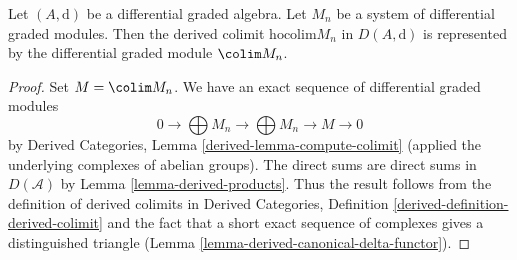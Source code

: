\begin{lemma}
\label{lemma-homotopy-colimit}
Let $(A, \text{d})$ be a differential graded algebra. Let
$M_n$ be a system of differential graded modules. Then the derived
colimit $\text{hocolim} M_n$ in $D(A, \text{d})$ is represented
by the differential graded module $\colim M_n$.
\end{lemma}

\begin{proof}
Set $M = \colim M_n$. We have an exact sequence of differential graded modules
$$
0 \to \bigoplus M_n \to \bigoplus M_n \to M \to 0
$$
by Derived Categories, Lemma \ref{derived-lemma-compute-colimit}
(applied the underlying complexes of abelian groups).
The direct sums are direct sums in $D(\mathcal{A})$ by
Lemma \ref{lemma-derived-products}.
Thus the result follows from the definition
of derived colimits in Derived Categories,
Definition \ref{derived-definition-derived-colimit}
and the fact that a short exact sequence of complexes
gives a distinguished triangle
(Lemma \ref{lemma-derived-canonical-delta-functor}).
\end{proof}
